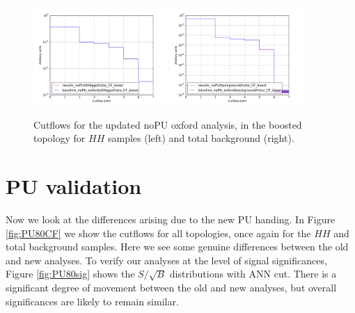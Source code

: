 \documentclass[11pt]{article}
\begin{document}
\begin{figure}[ht]
\begin{center}
\includegraphics[width=0.45\textwidth]{plots/diHiggs_noPU_CF.pdf}
\includegraphics[width=0.45\textwidth]{plots/background_noPU_CF.pdf}
\caption{Cutflows for the updated noPU oxford analysis, in the boosted topology for $HH$ samples (left) and total background (right).}
\label{fig:noPUboost}
\end{center}
\end{figure}
\newpage
\section{PU validation}
Now we look at the differences arising due to the new PU handing. In Figure \ref{fig:PU80CF} we show the cutflows for all topologies, once again for the $HH$ and total background samples. Here we see some genuine differences between the old and new analyses. To verify our analyses at the level of signal significances, Figure \ref{fig:PU80sig} shows the $S/\sqrt{B}$ distributions with ANN cut.  There is a significant degree of movement between the old and new analyses, but overall significances are likely to remain similar.
\end{document}

